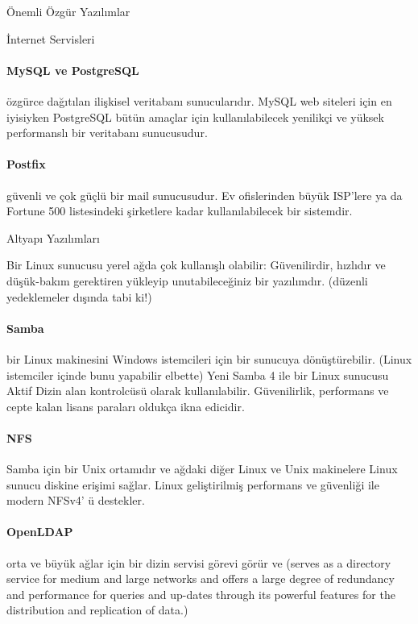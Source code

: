 \begin{section}{Önemli Özgür Yazılımlar}
\begin{subsection}{İnternet Servisleri}
\paragraph{MySQL ve PostgreSQL}{özgürce dağıtılan ilişkisel veritabanı sunucularıdır. MySQL web siteleri için en iyisiyken PostgreSQL bütün amaçlar için kullanılabilecek yenilikçi ve yüksek performanslı bir veritabanı sunucusudur.}
\paragraph{Postfix}{güvenli ve çok güçlü bir mail sunucusudur. Ev ofislerinden büyük ISP'lere ya da Fortune 500 listesindeki şirketlere kadar kullanılabilecek bir sistemdir.}
\end{subsection}
\begin{subsection}{Altyapı Yazılımları}

Bir Linux sunucusu yerel ağda çok kullanışlı olabilir: Güvenilirdir, hızlıdır ve düşük-bakım gerektiren yükleyip unutabileceğiniz bir yazılımdır. (düzenli yedeklemeler dışında tabi ki!)
\paragraph{Samba}{bir Linux makinesini Windows istemcileri için bir sunucuya dönüştürebilir. (Linux istemciler içinde bunu yapabilir elbette) Yeni Samba 4 ile bir Linux sunucusu Aktif Dizin alan kontrolcüsü olarak kullanılabilir. Güvenilirlik, performans ve cepte kalan lisans paraları oldukça ikna edicidir.}
\paragraph{NFS}{Samba için bir Unix ortamıdır ve ağdaki diğer Linux ve Unix makinelere Linux sunucu diskine erişimi sağlar. Linux geliştirilmiş performans ve güvenliği ile modern NFSv4' ü destekler.}
\paragraph{OpenLDAP}{orta ve büyük ağlar için bir dizin servisi görevi görür ve (serves as a directory service for medium and large networks and offers a large degree of redundancy and performance for queries and up-dates through its powerful features for the distribution and replication of data.)}

\end{subsection}
\end{section}
